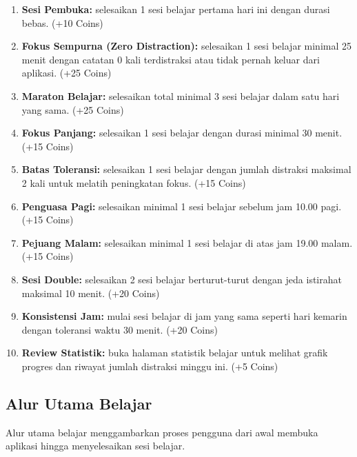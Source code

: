 \documentclass[11pt]{article}
\begin{document}
\begin{enumerate}[label=\arabic*.]
    \item \textbf{Sesi Pembuka:} selesaikan 1 sesi belajar pertama hari ini dengan durasi bebas. (+10 Coins)
    \item \textbf{Fokus Sempurna (Zero Distraction):} selesaikan 1 sesi belajar minimal 25 menit dengan catatan 0 kali terdistraksi atau tidak pernah keluar dari aplikasi. (+25 Coins)
    \item \textbf{Maraton Belajar:} selesaikan total minimal 3 sesi belajar dalam satu hari yang sama. (+25 Coins)
    \item \textbf{Fokus Panjang:} selesaikan 1 sesi belajar dengan durasi minimal 30 menit. (+15 Coins)
    \item \textbf{Batas Toleransi:} selesaikan 1 sesi belajar dengan jumlah distraksi maksimal 2 kali untuk melatih peningkatan fokus. (+15 Coins)
    \item \textbf{Penguasa Pagi:} selesaikan minimal 1 sesi belajar sebelum jam 10.00 pagi. (+15 Coins)
    \item \textbf{Pejuang Malam:} selesaikan minimal 1 sesi belajar di atas jam 19.00 malam. (+15 Coins)
    \item \textbf{Sesi Double:} selesaikan 2 sesi belajar berturut-turut dengan jeda istirahat maksimal 10 menit. (+20 Coins)
    \item \textbf{Konsistensi Jam:} mulai sesi belajar di jam yang sama seperti hari kemarin dengan toleransi waktu 30 menit. (+20 Coins)
    \item \textbf{Review Statistik:} buka halaman statistik belajar untuk melihat grafik progres dan riwayat jumlah distraksi minggu ini. (+5 Coins)
\end{enumerate}

\subsection{Alur Utama Belajar}

Alur utama belajar menggambarkan proses pengguna dari awal membuka aplikasi hingga menyelesaikan sesi belajar.
\end{document}
